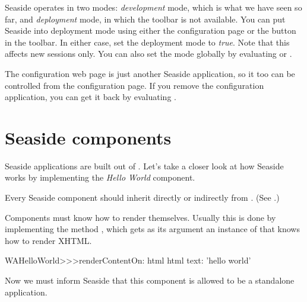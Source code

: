 \documentclass[a4paper,10pt,twoside]{book}
\begin{document}
Seaside operates in two modes: \emph{development} mode, which is what we have seen so far, and \emph{deployment} mode, in which the toolbar is not available.
You can put Seaside into deployment mode using either the configuration page or the  button in the toolbar.
In either case, set the deployment mode to \emph{true}.
Note that this affects new sessions only.  
You can also set the mode globally by evaluating
 
or
.

The configuration web page is just another Seaside application, so it too can be controlled from the configuration page.
If you remove the configuration  application, you can get it back by evaluating
 .

\section{Seaside components}

Seaside applications are built out of \emph{}.
Let's take a closer look at how Seaside works by implementing the \emph{Hello World} component.

Every Seaside component should inherit directly or indirectly from . (See .)


Components must know how to render themselves.
Usually this is done by implementing the method , which gets as its argument an instance of  that knows how to render XHTML.

\begin{code}{}
WAHelloWorld>>>renderContentOn: html
	html text: 'hello world'
\end{code}

\noindent
Now we must inform Seaside that this component is allowed to be a standalone application. 
\end{document}
